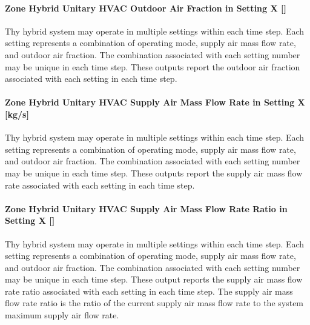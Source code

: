 \paragraph{Zone Hybrid Unitary HVAC Outdoor Air Fraction in Setting X []}
Thy hybrid system may operate in multiple settings within each time step. Each setting represents a combination of operating mode, supply air mass flow rate, and outdoor air fraction. The combination associated with each setting number may be unique in each time step. These outputs report the outdoor air fraction associated with each setting in each time step.

\paragraph{Zone Hybrid Unitary HVAC Supply Air Mass Flow Rate in Setting X [kg/s]}
Thy hybrid system may operate in multiple settings within each time step. Each setting represents a combination of operating mode, supply air mass flow rate, and outdoor air fraction. The combination associated with each setting number may be unique in each time step. These outputs report the supply air mass flow rate associated with each setting in each time step.

\paragraph{Zone Hybrid Unitary HVAC Supply Air Mass Flow Rate Ratio in Setting X []}
Thy hybrid system may operate in multiple settings within each time step. Each setting represents a combination of operating mode, supply air mass flow rate, and outdoor air fraction. The combination associated with each setting number may be unique in each time step. These output reports the supply air mass flow rate ratio associated with each setting in each time step. The supply air mass flow rate ratio is the ratio of the current supply air mass flow rate to the system maximum supply air flow rate.
